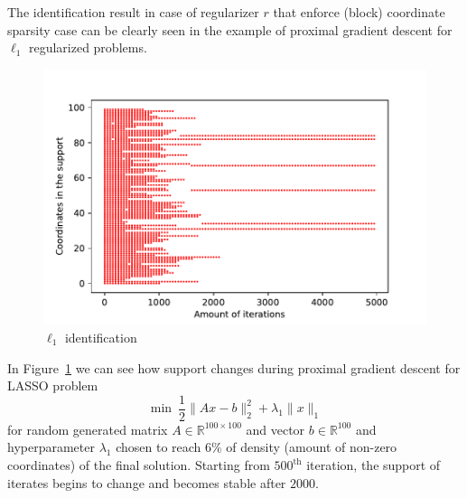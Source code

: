 The identification result in case of regularizer $r$ that enforce (block) coordinate sparsity case can be clearly seen in the example of proximal gradient descent for $\ell_1$ regularized problems.


\begin{figure}[H]
\centering

\includegraphics{basics_2/l1_supp.pdf}
\caption{$\ell_1$ identification}
\label{fig:l1supp}
\end{figure}

% 

In Figure~\ref{fig:l1supp} we can see how support changes during proximal gradient descent for LASSO problem 
$$
\min~\frac12\|Ax-b\|_2^2 + \lambda_1\|x\|_1
$$
for random generated matrix $A\in\mathbb{R}^{100\times100}$ and vector $b\in\mathbb{R}^{100}$ and hyperparameter $\lambda_1$ chosen to reach $6\%$ of density (amount of non-zero coordinates) of the final solution.
Starting from $500^{\text{th}}$ iteration, the support of iterates begins to change and becomes stable after $2000$.


